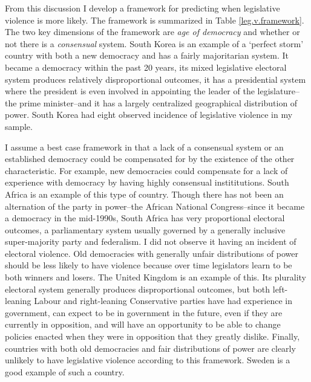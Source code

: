 \documentclass[a4paper]{article}\usepackage{graphicx, color}
\begin{document}
From this discussion I develop a framework for predicting when legislative violence is more likely. The framework is summarized in Table \ref{leg.v.framework}. The two key dimensions of the framework are {\emph{age of democracy}} and whether or not there is a  {\emph{consensual}} system. South Korea is an example of a `perfect storm' country with both a new democracy and has a fairly majoritarian system. It became a democracy within the past 20 years, its mixed legislative electoral system produces relatively disproportional outcomes, it has a presidential system where the president is even involved in appointing the leader of the legislature--the prime minister--and it has a largely centralized geographical distribution of power. South Korea had eight observed incidence of legislative violence in my sample.

I assume a best case framework in that a lack of a consensual system or an established democracy could be compensated for by the existence of the other characteristic. For example, new democracies could compensate for a lack of experience with democracy by having highly consensual instititutions. South Africa is an example of this type of country. Though there has not been an alternation of the party in power--the African National Congress--since it became a democracy in the mid-1990s, South Africa has very proportional electoral outcomes, a parliamentary system usually governed by a generally inclusive super-majority party and federalism. I did not observe it having an incident of electoral violence. Old democracies with generally unfair distributions of power should be less likely to have violence because over time legislators learn to be both winners and losers. The United Kingdom is an example of this. Its plurality electoral system generally produces disproportional outcomes, but both left-leaning Labour and right-leaning Conservative parties have had experience in government, can expect to be in government in the future, even if they are currently in opposition, and will have an opportunity to be able to change policies enacted when they were in opposition that they greatly dislike. Finally, countries with both old democracies and fair distributions of power are clearly unlikely to have legislative violence according to this framework. Sweden is a good example of such a country. 
\end{document}

